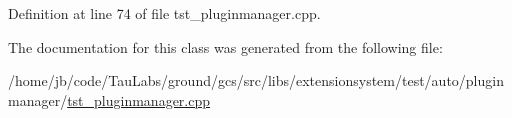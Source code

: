 \-Definition at line 74 of file tst\-\_\-pluginmanager.\-cpp.



\-The documentation for this class was generated from the following file\-:\begin{DoxyCompactItemize}
\item 
/home/jb/code/\-Tau\-Labs/ground/gcs/src/libs/extensionsystem/test/auto/pluginmanager/\hyperlink{tst__pluginmanager_8cpp}{tst\-\_\-pluginmanager.\-cpp}\end{DoxyCompactItemize}
